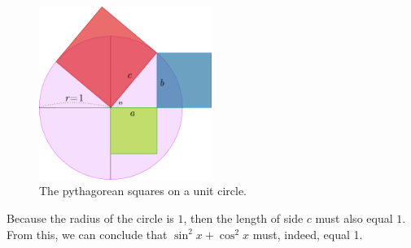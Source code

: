 \begin{figure}[H]
  \begin{center}
    \includegraphics[width=0.5\textwidth]{continuous/trig/pythcircle.eps}
    \caption{The pythagorean squares on a unit circle.}
  \end{center}
  \label{fig:pythcircle}
\end{figure}
Because the radius of the circle is $1$, then the length of side $c$ must also equal $1$.
From this, we can conclude that $\sin^2x+\cos^2x$ must, indeed, equal 1.

